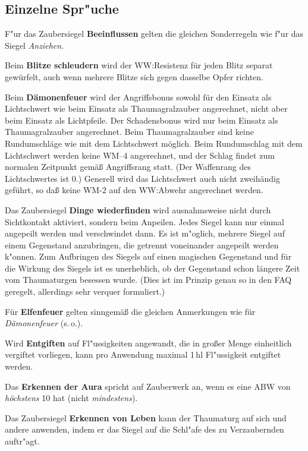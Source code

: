 \documentclass[10pt,a4paper,germanpar]{article}
\begin{document}
\subsection{Einzelne Spr"uche}

F"ur das Zaubersiegel \textbf{Beeinflussen} gelten die gleichen
Sonderregeln wie f"ur das Siegel \emph{Anziehen}.

Beim \textbf{Blitze schleudern} wird der WW:Resistenz für jeden Blitz separat
gewürfelt, auch wenn mehrere Blitze sich gegen dasselbe Opfer richten.

Beim \textbf{Dämonenfeuer} wird der Angriffsbonus sowohl für den
Einsatz als Lichtschwert wie beim Einsatz als Thaumagralzauber
angerechnet, nicht aber beim Einsatz als Lichtpfeile. Der
Schadensbonus wird nur beim Einsatz als Thaumagralzauber
angerechnet. Beim Thaumagralzauber sind keine Rundumschläge wie mit
dem Lichtschwert möglich. Beim Rundumschlag mit dem Lichtschwert
werden keine WM--4 angerechnet, und der Schlag findet zum normalen
Zeitpunkt gemäß Angriffsrang statt. (Der Waffenrang des Lichtschwertes
ist 0.) Generell wird das Lichtschwert auch nicht zweihändig geführt,
so daß keine WM-2 auf den WW:Abwehr angerechnet werden.

Das Zaubersiegel \textbf{Dinge wiederfinden} wird ausnahmsweise nicht
durch Sichtkontakt aktiviert, sondern beim Anpeilen. Jedes Siegel kann 
nur einmal angepeilt werden und verschwindet dann. Es ist m"oglich,
mehrere Siegel auf einem Gegenstand anzubringen, die getrennt
voneinander angepeilt werden k"onnen. Zum Aufbringen des Siegels auf
einen magischen Gegenstand und für die Wirkung des Siegels ist es
unerheblich, ob der Gegenstand schon längere Zeit vom Thaumaturgen
besessen wurde. (Dies ist im Prinzip genau so in den FAQ geregelt,
allerdings sehr verquer formuliert.)

Für \textbf{Elfenfeuer} gelten sinngemäß die gleichen Anmerkungen
wie für \emph{Dämonenfeuer} (s.\,o.).

Wird \textbf{Entgiften} auf Fl"ussigkeiten angewandt, die in großer
Menge einheitlich vergiftet vorliegen, kann pro Anwendung maximal
1\,hl Fl"ussigkeit entgiftet werden.

Das \textbf{Erkennen der Aura} spricht auf Zauberwerk an, wenn es eine ABW von
\emph{höchstens} 10 hat (nicht \emph{mindestens}).

Das Zaubersiegel \textbf{Erkennen von Leben} kann der Thaumaturg auf
sich und andere anwenden, indem er das Siegel auf die Schl"afe des zu
Verzaubernden auftr"agt.
\end{document}
